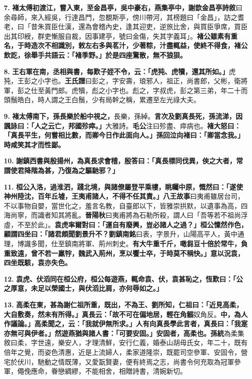 \textbf{7.} \textbf{褚太傅初渡江，嘗入東，至金昌亭，吳中豪右，燕集亭中，}{\footnotesize \textbf{謝歆金昌亭詩敘}曰余尋師，來入經吳，行達昌門，忽覩斯亭，傍川帶河，其榜題曰「金昌」，訪之耆老，曰「昔朱買臣仕漢，還為會稽內史，逢其迎吏，逆旅比舍，與買臣爭席，買臣出其印綬，群吏慚服自裁，因事建亭，號曰金傷，失其字義耳」。}\textbf{褚公雖素有重名，于時造次不相識別，敕左右多與茗汁，少著粽，汁盡輒益，使終不得食，褚公飲訖，徐舉手共語云：「褚季野。」於是四座驚散，無不狼狽。}

\textbf{8.} \textbf{王右軍在南，丞相與書，每歎子姪不令，云：「虎㹠、虎犢，還其所如。」}{\footnotesize 虎㹠，王彭之小字也。\textbf{王氏譜}曰彭之，字安壽，琅邪人，祖正，尚書郎，父彬，衛將軍，彭之仕至黃門郎。虎犢，彪之小字也。彪之，字叔虎，彭之第三弟，年二十而頭鬚皓白，時人謂之王白鬚，少有局幹之稱，累遷至左光祿大夫。}

\textbf{9.} \textbf{褚太傅南下，孫長樂於船中視之，}{\footnotesize 長樂，孫綽。}\textbf{言次及劉真長死，孫流涕，因諷詠曰：「人之云亡，邦國殄瘁。」}{\footnotesize 大雅詩。\textbf{毛公}注曰殄盡、瘁病也。}\textbf{褚大怒曰：「真長平生，何嘗相比數，而卿今日作此面向人。」孫回泣向褚曰：「卿當念我。」時咸笑其才而性鄙。}

\textbf{10.} \textbf{謝鎮西書與殷揚州，為真長求會稽，殷答曰：「真長標同伐異，俠之大者，常謂使君降階為甚，乃復為之驅馳邪？」}

\textbf{11.} \textbf{桓公入洛，過淮泗，踐北境，與諸僚屬登平乘樓，眺矚中原，慨然曰：「遂使神州陸沈，百年丘墟，王夷甫諸人，不得不任其責。」}{\footnotesize \textbf{八王故事}曰夷甫雖居台司，不以事物自嬰，當世化之，羞言名教，自臺郎以下，皆雅崇拱默，以遺事為高，四海尚寧，而識者知其將亂。\textbf{晉陽秋}曰夷甫將為石勒所殺，謂人曰「吾等若不祖尚浮虛，不至於此」。}\textbf{袁虎率爾對曰：「運自有廢興，豈必諸人之過？」桓公懍然作色，顧謂四坐曰：「諸君頗聞劉景升不？}{\footnotesize \textbf{劉鎮南銘}曰表，字景升，山陽高平人，黃中通理，博識多聞，仕至鎮南將軍、荊州刺史。}\textbf{有大牛重千斤，噉芻豆十倍於常牛，負重致遠，曾不若一羸牸，魏武入荊州，烹以饗士卒，于時莫不稱快。」意以況袁，四坐既駭，袁亦失色。}

\textbf{12.} \textbf{袁虎、伏滔同在桓公府，桓公每遊燕，輒命袁、伏，袁甚恥之，恆歎曰：「公之厚意，未足以榮國士，與伏滔比肩，亦何辱如之。」}

\textbf{13.} \textbf{高柔在東，甚為謝仁祖所重，既出，不為王、劉所知，仁祖曰：「近見高柔，大自敷奏，然未有所得。」真長云：「故不可在偏地居，輕在角䚥}{\footnotesize 奴角反。}\textbf{中，為人作議論。」高柔聞之，云：「我就伊無所求。」人有向真長學此言者，真長曰：「我寔亦無可與伊者。」然遊燕猶與諸人書：「可要安固。」安固者，高柔也。}{\footnotesize \textbf{孫統}為柔集敘曰柔，字世遠，樂安人，才理清鮮，安行仁義，婚泰山胡毋氏女，年二十，既有倍年之覺，而姿色清惠，近是上流婦人，柔家道隆崇，既罷司空參軍、安固令，營宅於伏川，馳動之情既薄，又愛翫賢妻，便有終焉之志，尚書令何充取為冠軍參軍，僶俛應命，眷戀綢繆，不能相舍，相贈詩書，清婉新切。}

